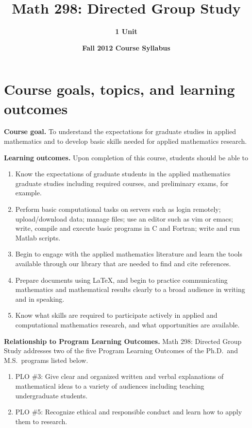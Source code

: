 \documentclass{article}
\newcommand{\secskip}{\vspace{6pt}}
\begin{document}
\title{{\bf Math 298: Directed Group Study}}
\author{{\bf 1 Unit}}
\date{{\bf Fall 2012 Course Syllabus}}
\maketitle

\section*{Course goals, topics, and learning outcomes}

{\bf Course goal.} To understand the expectations for graduate studies
in applied mathematics and to develop basic skills needed for applied
mathematics research.

\secskip

{\bf Learning outcomes.} Upon completion of this course, students
should be able to 
\begin{enumerate}

\item Know the expectations of graduate students in the applied
  mathematics graduate studies including required courses, and
  preliminary exams, for example.

\item Perform basic computational tasks on servers such as login
  remotely; upload/download data; manage files; use an editor such as
  vim or emacs; write, compile and execute basic programs in C and
  Fortran; write and run Matlab scripts.

\item Begin to engage with the applied mathematics literature and
  learn the tools available through our library that are needed to
  find and cite references.

\item Prepare documents using \LaTeX, and begin to practice
  communicating mathematics and mathematical results clearly to a
  broad audience in writing and in speaking.

\item Know what skills are required to participate actively in applied
  and computational mathematics research, and what opportunities are
  available.

\end{enumerate}

\secskip

{\bf Relationship to Program Learning Outcomes.} Math 298: Directed
Group Study addresses two of the five Program Learning Outcomes of the
Ph.D.~and M.S.~programs listed below.
\begin{enumerate}

\item PLO \#3: Give clear and organized written and verbal explanations
  of mathematical ideas to a variety of audiences including teaching
  undergraduate students.

\item PLO \#5: Recognize ethical and responsible conduct and learn how
  to apply them to research.

\end{enumerate}
\end{document}
